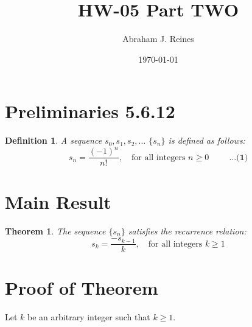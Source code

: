 \documentclass[12pt]{article}
\newtheorem{theorem}{Theorem}
\newtheorem{definition}{Definition}
\begin{document}
\doublespacing %

\title{HW-05 Part TWO}
\author{Abraham J. Reines}
\date{\today}
\maketitle

\section{Preliminaries 5.6.12}

\begin{definition}
A sequence \( s_0, s_1, s_2, \ldots \) \( \{ s_n \} \) is defined as follows:
\[
s_n = \frac{{(-1)^n}}{{n!}}, \quad \text{for all integers } n \geq 0 \hspace{1cm} \textbf{\ldots(1)}
\]
\end{definition}

\section{Main Result}

\begin{theorem}
The sequence \( \{ s_n \} \) satisfies the recurrence relation:
\[
s_k = \frac{{-s_{k-1}}}{{k}}, \quad \text{for all integers } k \geq 1
\]
\end{theorem}

\section{Proof of Theorem}

Let \( k \) be an arbitrary integer such that \( k \geq 1 \).
\end{document}
